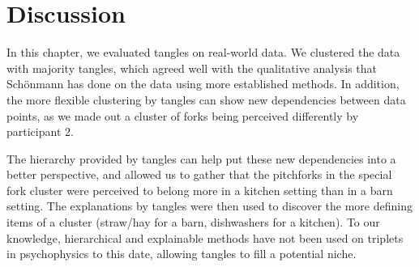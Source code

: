\section{Discussion}
In this chapter, we evaluated tangles on real-world data.  
We clustered the data with majority tangles, which agreed well with the qualitative analysis that Schönmann has done on the data using more established methods. 
In addition, the more flexible clustering by tangles can show new dependencies between data points, as we 
made out a cluster of forks being perceived differently by participant 2. 

The hierarchy provided by tangles can help put these new dependencies into a better perspective, 
and allowed us to gather that the pitchforks in the special fork cluster were perceived to 
belong more in a kitchen setting than in a barn setting.
The explanations by tangles were then used to discover the more defining items of a cluster (straw/hay for
a barn, dishwashers for a kitchen). To our knowledge, hierarchical and explainable methods
have not been used on triplets in psychophysics to this date, allowing tangles to fill a potential niche.

\FloatBarrier

